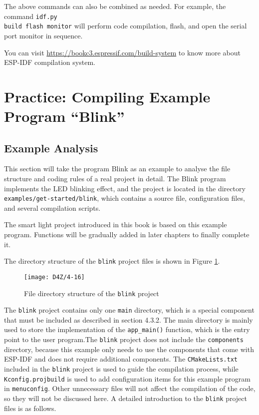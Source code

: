 \documentclass[a4paper,12pt]{book}
\begin{document}
The above commands can also be combined as needed. For example, the command \verb|idf.py |\\ \verb|build flash monitor| will perform code compilation, flash, and open the serial port monitor in sequence.

You can visit \url{https://bookc3.espressif.com/build-system} to know more about ESP-IDF compilation system.

\section{Practice: Compiling Example Program “Blink”}
\subsection{Example Analysis}
This section will take the program Blink as an example to analyse the file structure and coding rules of a real project in detail. The Blink program implements the LED blinking effect, and the project is located in the directory \verb|examples/get-started/blink|, which contains a source file, configuration files, and several compilation scripts.

The smart light project introduced in this book is based on this example program. Functions will be gradually added in later chapters to finally complete it.


The directory structure of the \verb|blink| project files is shown in Figure \ref{File directory structure of the blink project}.

\begin{figure}[h!]
    \centering
    \texttt{[image: D4Z/4-16]}
    \caption{File directory structure of the \texttt{blink} project}
    \label{File directory structure of the blink project}
\end{figure}

The \verb|blink| project contains only one \verb|main| directory, which is a special component that must be included as described in section 4.3.2. The main directory is mainly used to store the implementation of the \verb|app_main()| function, which is the entry point to the user program.The \verb|blink| project does not include the \verb|components| directory, because this example only needs to use the components that come with ESP-IDF and does not require additional components. The \verb|CMakeLists.txt| included in the \verb|blink| project is used to guide the compilation process, while \verb|Kconfig.projbuild| is used to add configuration items for this example program in \verb|menuconfig|. Other unnecessary files will not affect the compilation of the code, so they will not be discussed here. A detailed introduction to the \verb|blink| project files is as follows.
\end{document}
